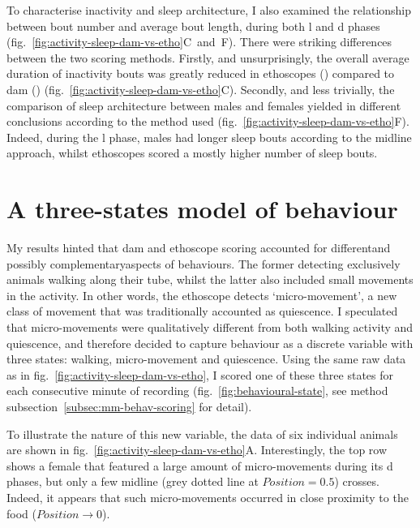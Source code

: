 To characterise inactivity and sleep architecture, I also examined the relationship between bout number and average bout length, during both \gls{l} and \gls{d} phases (fig.~\ref{fig:activity-sleep-dam-vs-etho}C~and~F).
There were striking differences between the two scoring methods.
Firstly, and unsurprisingly, the overall average duration of inactivity bouts was greatly reduced in ethoscopes () compared to \gls{dam} () (fig.~\ref{fig:activity-sleep-dam-vs-etho}C).
Secondly, and less trivially, the comparison of sleep architecture between males and females yielded in different conclusions according to the method used (fig.~\ref{fig:activity-sleep-dam-vs-etho}F). Indeed, during the \gls{l} phase, males had longer sleep bouts according to the midline approach, whilst ethoscopes scored a mostly higher number of sleep bouts.



\section{A three-states model of behaviour}

My results hinted that \gls{dam} and ethoscope scoring accounted for different\emd{}and possibly complementary\emd{}aspects of behaviours.
The former detecting  exclusively animals walking along their tube, whilst the latter also included small movements in the activity.
In other words, the ethoscope detects `micro-movement', a new class of movement that was traditionally accounted as quiescence.
I speculated that micro-movements were qualitatively different from both walking activity and quiescence, and therefore decided to capture behaviour as a discrete variable with three states: walking, micro-movement and quiescence.
Using the same raw data as in fig.~\ref{fig:activity-sleep-dam-vs-etho},
I scored one of these three states for each consecutive minute of recording (fig.~\ref{fig:behavioural-state}, see method subsection~\ref{subsec:mm-behav-scoring} for detail).



To illustrate the nature of this new variable, the data of six individual animals are shown in fig.~\ref{fig:activity-sleep-dam-vs-etho}A.
Interestingly, the top row shows a female that featured a large amount of micro-movements during its \gls{d} phases, but only a few midline (grey dotted line at $Position = 0.5$) crosses.
Indeed, it appears that such micro-movements occurred in close proximity to the food ($Position \rightarrow 0$).

